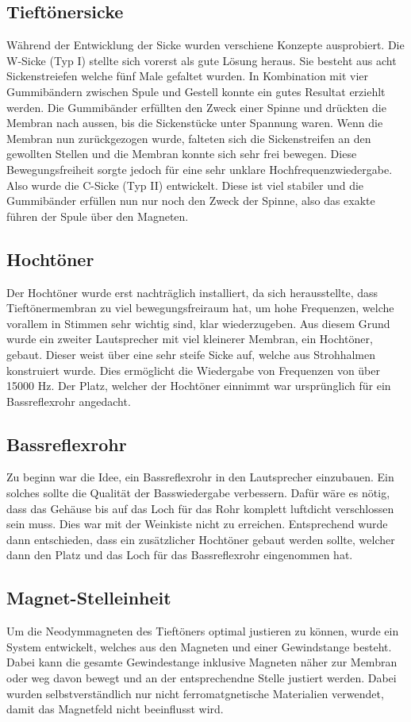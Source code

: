 \documentclass[a4paper,11pt]{report}
\begin{document}
\subsection{Tieftönersicke}
Während der Entwicklung der Sicke wurden verschiene Konzepte ausprobiert. Die W-Sicke (Typ I) stellte sich vorerst als gute Lösung heraus. Sie besteht aus acht Sickenstreiefen welche fünf Male gefaltet wurden. In Kombination mit vier Gummibändern zwischen Spule und Gestell konnte ein gutes Resultat erziehlt werden. Die Gummibänder erfüllten den Zweck einer Spinne und drückten die Membran nach aussen, bis die Sickenstücke unter Spannung waren. Wenn die Membran nun zurückgezogen wurde, falteten sich die Sickenstreifen an den gewollten Stellen und die Membran konnte sich sehr frei bewegen. Diese Bewegungsfreiheit sorgte jedoch für eine sehr unklare Hochfrequenzwiedergabe. Also wurde die C-Sicke (Typ II) entwickelt. Diese ist viel stabiler und die Gummibänder erfüllen nun nur noch den Zweck der Spinne, also das exakte führen der Spule über den Magneten. 

\subsection{Hochtöner}
Der Hochtöner wurde erst nachträglich installiert, da sich herausstellte, dass Tieftönermembran zu viel bewegungsfreiraum hat, um hohe Frequenzen, welche vorallem in Stimmen sehr wichtig sind, klar wiederzugeben. Aus diesem Grund wurde ein zweiter Lautsprecher mit viel kleinerer Membran, ein Hochtöner, gebaut. Dieser weist über eine sehr steife Sicke auf, welche aus Strohhalmen konstruiert wurde. Dies ermöglicht die Wiedergabe von Frequenzen von über 15000 Hz. Der Platz, welcher der Hochtöner einnimmt war ursprünglich für ein Bassreflexrohr angedacht.

\subsection{Bassreflexrohr}
Zu beginn war die Idee, ein Bassreflexrohr in den Lautsprecher einzubauen. Ein solches sollte die Qualität der Basswiedergabe verbessern. Dafür wäre es nötig, dass das Gehäuse bis auf das Loch für das Rohr komplett luftdicht verschlossen sein muss. Dies war mit der Weinkiste nicht zu erreichen. Entsprechend wurde dann entschieden, dass ein zusätzlicher Hochtöner gebaut werden sollte, welcher dann den Platz und das Loch für das Bassreflexrohr eingenommen hat.

\subsection{Magnet-Stelleinheit}
Um die Neodymmagneten des Tieftöners optimal justieren zu können, wurde ein System entwickelt, welches aus den Magneten und einer Gewindstange besteht. Dabei kann die gesamte Gewindestange inklusive Magneten näher zur Membran oder weg davon bewegt und an der entsprechendne Stelle justiert werden. Dabei wurden selbstverständlich nur nicht ferromatgnetische Materialien verwendet, damit das Magnetfeld nicht beeinflusst wird.
\end{document}
